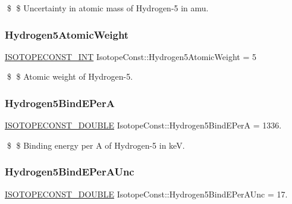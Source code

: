 \$ \$ Uncertainty in atomic mass of Hydrogen-\/5 in amu. \mbox{\label{group___isotope_const-_hydrogen-_h5_gaf06d949c392165534c3962b9d9826b2b}} 
\subsubsection{\texorpdfstring{Hydrogen5\+Atomic\+Weight}{Hydrogen5AtomicWeight}}
{\footnotesize\ttfamily \mbox{\hyperlink{group___isotope_const-_macros_ga5f18360b3e99483a35c32d789e62621c}{I\+S\+O\+T\+O\+P\+E\+C\+O\+N\+S\+T\+\_\+\+I\+NT}} Isotope\+Const\+::\+Hydrogen5\+Atomic\+Weight = 5}

\$ \$ Atomic weight of Hydrogen-\/5. \mbox{\label{group___isotope_const-_hydrogen-_h5_gaf92ad64b11dc0cad09996f7128dbc32a}} 
\subsubsection{\texorpdfstring{Hydrogen5\+Bind\+E\+PerA}{Hydrogen5BindEPerA}}
{\footnotesize\ttfamily \mbox{\hyperlink{group___isotope_const-_macros_ga8f45a7272ce02c0b4c65c44636ed719a}{I\+S\+O\+T\+O\+P\+E\+C\+O\+N\+S\+T\+\_\+\+D\+O\+U\+B\+LE}} Isotope\+Const\+::\+Hydrogen5\+Bind\+E\+PerA = 1336.}

\$ \$ Binding energy per A of Hydrogen-\/5 in keV. \mbox{\label{group___isotope_const-_hydrogen-_h5_gaee7ae21948a656f4a49f346604da6028}} 
\subsubsection{\texorpdfstring{Hydrogen5\+Bind\+E\+Per\+A\+Unc}{Hydrogen5BindEPerAUnc}}
{\footnotesize\ttfamily \mbox{\hyperlink{group___isotope_const-_macros_ga8f45a7272ce02c0b4c65c44636ed719a}{I\+S\+O\+T\+O\+P\+E\+C\+O\+N\+S\+T\+\_\+\+D\+O\+U\+B\+LE}} Isotope\+Const\+::\+Hydrogen5\+Bind\+E\+Per\+A\+Unc = 17.}

